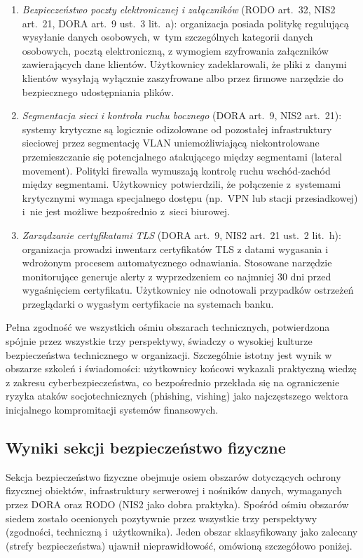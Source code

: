 \begin{enumerate}[label=(\roman*)]
  \item \textit{Bezpieczeństwo poczty elektronicznej i załączników} (RODO art.~32, NIS2 art.~21, DORA art.~9 ust.~3 lit.~a): organizacja posiada politykę regulującą wysyłanie danych osobowych, w~tym szczególnych kategorii danych osobowych, pocztą elektroniczną, z wymogiem szyfrowania załączników zawierających dane klientów. Użytkownicy zadeklarowali, że pliki z~danymi klientów wysyłają wyłącznie zaszyfrowane albo przez firmowe narzędzie do bezpiecznego udostępniania plików.

  \item \textit{Segmentacja sieci i kontrola ruchu bocznego} (DORA art.~9, NIS2 art.~21): systemy krytyczne są logicznie odizolowane od pozostałej infrastruktury sieciowej przez segmentację VLAN uniemożliwiającą niekontrolowane przemieszczanie się potencjalnego atakującego między segmentami (lateral movement). Polityki firewalla wymuszają kontrolę ruchu wschód-zachód między segmentami. Użytkownicy potwierdzili, że połączenie z~systemami krytycznymi wymaga specjalnego dostępu (np.\ VPN lub stacji przesiadkowej) i~nie jest możliwe bezpośrednio z~sieci biurowej.

  \item \textit{Zarządzanie certyfikatami TLS} (DORA art.~9, NIS2 art.~21 ust.~2 lit.~h): organizacja prowadzi inwentarz certyfikatów TLS z datami wygasania i wdrożonym procesem automatycznego odnawiania. Stosowane narzędzie monitorujące generuje alerty z wyprzedzeniem co najmniej 30 dni przed wygaśnięciem certyfikatu. Użytkownicy nie odnotowali przypadków ostrzeżeń przeglądarki o wygasłym certyfikacie na systemach banku.
\end{enumerate}

Pełna zgodność we wszystkich ośmiu obszarach technicznych, potwierdzona spójnie przez wszystkie trzy perspektywy, świadczy o wysokiej kulturze bezpieczeństwa technicznego w organizacji. Szczególnie istotny jest wynik w obszarze szkoleń i świadomości: użytkownicy końcowi wykazali praktyczną wiedzę z zakresu cyberbezpieczeństwa, co bezpośrednio przekłada się na ograniczenie ryzyka ataków socjotechnicznych (phishing, vishing) jako najczęstszego wektora inicjalnego kompromitacji systemów finansowych.


\subsection{Wyniki sekcji bezpieczeństwo fizyczne}

Sekcja bezpieczeństwo fizyczne obejmuje osiem obszarów dotyczących ochrony fizycznej obiektów, infrastruktury serwerowej i nośników danych, wymaganych przez DORA oraz RODO (NIS2 jako dobra praktyka). Spośród ośmiu obszarów siedem zostało ocenionych pozytywnie przez wszystkie trzy perspektywy (zgodności, techniczną i~użytkownika). Jeden obszar sklasyfikowany jako zalecany (strefy bezpieczeństwa) ujawnił nieprawidłowość, omówioną szczegółowo poniżej.

